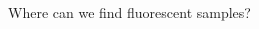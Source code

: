 \documentclass[presentation]{beamer}
\begin{document}
\begin{frame}{Where can we find fluorescent samples?} 
  \begin{columns}
    \begin{column}{.33\textwidth}
      \centering
      \\ \vspace{0.2em}
      \\
    \end{column}
    \begin{column}{.33\textwidth}
      \centering
      \\ \vspace{0.2em}

\end{column}
\end{columns}
\end{frame}
\end{document}
